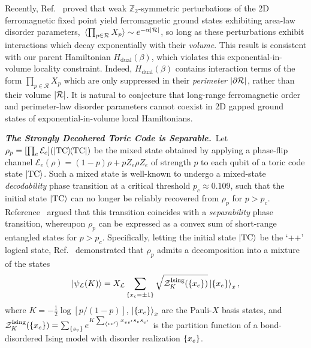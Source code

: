 \documentclass[aps,prl,twocolumn,floatfix,nofootinbib]{revtex4-2}
\theoremstyle{definition}
\newcommand{\TC}{\text{TC}}
\begin{document}
Recently, Ref.~ proved that weak $\mathbb{Z}_{2}$-symmetric perturbations of the 2D ferromagnetic fixed point yield ferromagnetic ground states exhibiting area-law disorder parameters, $\expval*{\prod_{p \in \mathcal{R}} X_{p}} \sim e^{-\alpha \abs{\mathcal{R}}}$, so long as these perturbations exhibit interactions which decay exponentially with their \emph{volume}. This result is consistent with our parent Hamiltonian $H_{\text{dual}}(\beta)$, which violates this exponential-in-volume locality constraint. Indeed, $H_{\text{dual}}(\beta)$ contains interaction terms of the form $\prod_{p \in \mathcal{R}} X_{p}$ which are only suppressed in their \emph{perimeter} $\abs{\partial \mathcal{R}}$, rather than their volume $\abs{\mathcal{R}}$. It is natural to conjecture that long-range ferromagnetic order and perimeter-law disorder parameters cannot coexist in 2D gapped ground states of exponential-in-volume local Hamiltonians.


\textbf{\textit{The Strongly Decohered Toric Code is Separable.}}~Let $\rho_{p} = [\prod_{e} \mathcal{E}_{e}]( \dyad{\TC} )$ be the mixed state obtained by applying a phase-flip channel $\mathcal{E}_{e}(\rho) = (1 - p) \rho + p Z_{e} \rho Z_{e}$ of strength $p$ to each qubit of a toric code state $\ket{\TC}$. Such a mixed state is well-known to undergo a mixed-state \emph{decodability} phase transition \cite{dennis_topological_2002,fan_diagnostics_2024} at a critical threshold $p_{c} \approx 0.109$, such that the initial state $\ket{\TC}$ can no longer be reliably recovered from $\rho_{p}$ for $p > p_{c}$. Reference~ argued that this transition coincides with a \emph{separability} phase transition, whereupon $\rho_{p}$ can be expressed as a convex sum of short-range entangled states for $p > p_{c}$. Specifically, letting the initial state $\ket{\TC}$ be the `++' logical state, Ref.~ demonstrated that $\rho_{p}$ admits a decomposition into a mixture of the states
\begin{equation}
    \ket{\psi_{\mathcal{L}}(K)} = X_{\mathcal{L}} \sum_{\qty{x_{e} = \pm 1}} \sqrt{ \mathcal{Z}^{\text{Ising}}_{K}(\qty{x_{e}}) } \ket{\qty{x_{e}}}_x ,
\end{equation}
where $K = - \frac{1}{2} \log[p / (1-p)]$, $\ket{\qty{x_{e}}}_{x}$ are the Pauli-$X$ basis states, and $\mathcal{Z}^{\text{Ising}}_{K}(\qty{x_{e}}) = \sum_{\qty{s_{v}}} e^{K \sum_{\expval{v v'}} x_{v v'} s_{v} s_{v'}}$ is the partition function of a bond-disordered Ising model with disorder realization $\qty{x_{e}}$. 
\end{document}
